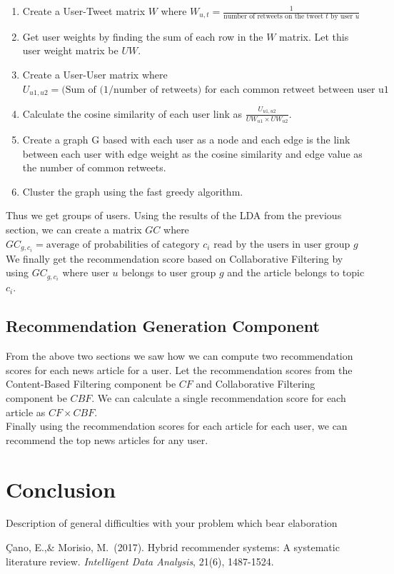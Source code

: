 \documentclass{article}
\begin{document}
\begin{enumerate}
\item Create a User-Tweet matrix $W$ where $W_{u, t} = \displaystyle\frac{1}{\textrm{number of retweets on the tweet $t$ by user $u$}}$
\item Get user weights by finding the sum of each row in the $W$ matrix. Let this user weight matrix be $UW$.
\item Create a User-User matrix where $U_{u1, u2} = \textrm{(Sum of (1/number of retweets) for each common retweet between user u1 and u2)}$ 
\item Calculate the cosine similarity of each user link as $\displaystyle\frac{U_{u1, u2}}{UW_{u1} \times UW_{u2}}$.
\item Create a graph G based with each user as a node and each edge is the link between each user with edge weight as the cosine similarity and edge value as the number of common retweets.
\item Cluster the graph using the fast greedy algorithm. 
\end{enumerate}

Thus we get groups of users. Using the results of the LDA from the previous section, we can create a matrix $GC$ where $GC_{g, c_i} = \textrm{average of probabilities of category $c_i$ read by the users in user group $g$}$ \\

We finally get the recommendation score based on Collaborative Filtering by using $GC_{g, c_i}$ where user $u$ belongs to user group $g$ and the article belongs to topic $c_i$.
\subsection{Recommendation Generation Component}

From the above two sections we saw how we can compute two recommendation scores for each news article for a user. Let the recommendation scores from the Content-Based Filtering component be $CF$ and Collaborative Filtering component be $CBF$. We can calculate a single recommendation score for each article as $CF \times CBF$. \\

Finally using the recommendation scores for each article for each user, we can recommend the top news articles for any user. \\


\section{Conclusion}

{Description of general difficulties with your problem which bear elaboration
}

\begin{thebibliography}{9}

 Çano, E.,\& Morisio, M.\ (2017). Hybrid recommender systems: A systematic literature review. {\it Intelligent Data Analysis}, 21(6), 1487-1524.
\end{thebibliography}
\end{document}
